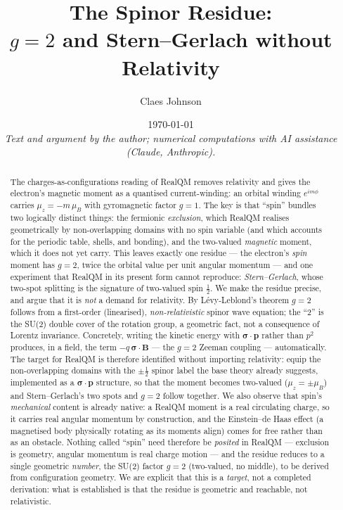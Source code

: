 \documentclass[11pt]{article}
\title{The Spinor Residue:\\
$g=2$ and Stern--Gerlach without Relativity}
\author[1]{Claes Johnson}
\affil[1]{KTH Royal Institute of Technology, SE-100 44 Stockholm, Sweden \\
\texttt{claesjohnson@gmail.com}}
\date{\today \\[0.4em]
\small\textit{Text and argument by the author; numerical computations with AI assistance (Claude, Anthropic).}}
\begin{document}
\maketitle

\begin{abstract}
The charges-as-configurations reading of RealQM removes relativity and gives the electron's magnetic
moment as a quantised current-winding: an orbital winding $e^{im\phi}$ carries $\mu_z = -m\,\mu_B$ with
gyromagnetic factor $g=1$. The key is that ``spin'' bundles two logically distinct things: the fermionic
\emph{exclusion}, which RealQM realises geometrically by non-overlapping domains with no spin variable
(and which accounts for the periodic table, shells, and bonding), and the two-valued \emph{magnetic}
moment, which it does not yet carry. This leaves exactly one residue --- the electron's \emph{spin} moment
has $g=2$, twice the orbital value per unit angular momentum --- and one experiment that RealQM in its
present form cannot reproduce: \emph{Stern--Gerlach}, whose two-spot splitting is the signature of
two-valued spin $\tfrac12$. We make the residue precise, and argue that it is \emph{not} a demand for relativity. By
Lévy-Leblond's theorem $g=2$ follows from a first-order (linearised), \emph{non-relativistic} spinor wave
equation; the ``2'' is the SU(2) double cover of the rotation group, a geometric fact, not a consequence
of Lorentz invariance. Concretely, writing the kinetic energy with $\boldsymbol\sigma\cdot\mathbf p$
rather than $p^2$ produces, in a field, the term $-q\,\boldsymbol\sigma\cdot\mathbf B$ --- the $g=2$
Zeeman coupling --- automatically. The target for RealQM is therefore identified without importing
relativity: equip the non-overlapping domains with the $\pm\tfrac12$ spinor label the base theory already
suggests, implemented as a $\boldsymbol\sigma\cdot\mathbf p$ structure, so that the moment becomes
two-valued ($\mu_z=\pm\mu_B$) and Stern--Gerlach's two spots and $g=2$ follow together. We also observe that spin's
\emph{mechanical} content is already native: a RealQM moment is a real circulating charge, so it carries real
angular momentum by construction, and the Einstein--de Haas effect (a magnetised body physically rotating as its
moments align) comes for free rather than as an obstacle. Nothing called ``spin'' need therefore be \emph{posited}
in RealQM --- exclusion is geometry, angular momentum is real charge motion --- and the residue reduces to a
single geometric \emph{number}, the SU(2) factor $g=2$ (two-valued, no middle), to be derived from configuration
geometry. We are explicit that this is a \emph{target}, not a completed derivation: what is established is that
the residue is geometric and reachable, not relativistic.
\end{abstract}
\end{document}
